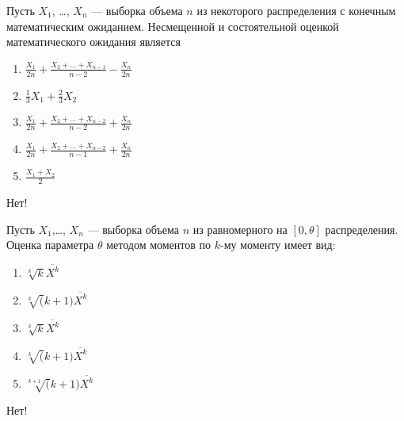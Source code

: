 \documentclass[t]{beamer}
\begin{document}
 \begin{frame} \label{33-No} 
\begin{block}{33} 

Пусть $X_1$, \ldots, $X_n$ — выборка объема $n$ из некоторого распределения с конечным математическим ожиданием. Несмещенной и состоятельной оценкой математического ожидания является
 


 \end{block} 
\begin{enumerate} 
\item[] \hyperlink{33-Yes}{\beamergotobutton{} $\frac{X_1}{2n}+\frac{X_2+\ldots+X_{n-1}}{n-2}-\frac{X_n}{2 n}$}
\item[] \hyperlink{33-No}{\beamergotobutton{} $\frac{1}{3} X_1 + \frac{2}{3} X_2$}
\item[] \hyperlink{33-No}{\beamergotobutton{} $\frac{X_1}{2 n}+\frac{X_2+\ldots+X_{n-2}}{n-2}+\frac{X_n}{2 n}$}
\item[] \hyperlink{33-No}{\beamergotobutton{} $\frac{X_1}{2 n}+\frac{X_2+\ldots+X_{n-2}}{n-1}+\frac{X_n}{2 n}$}
\item[] \hyperlink{33-No}{\beamergotobutton{} $\frac{X_1+X_2}{2}$}
\end{enumerate} 

 \alert{Нет!} 
\end{frame} 


 \begin{frame} \label{34-No} 
\begin{block}{34} 

Пусть $X_1$,\ldots, $X_n$ — выборка объема $n$ из равномерного на $[0, \theta]$ распределения. Оценка параметра $\theta$ методом моментов по $k$-му моменту имеет вид:
 


 \end{block} 
\begin{enumerate} 
\item[] \hyperlink{34-No}{\beamergotobutton{} $\sqrt[k]k \overline{X^k}$}
\item[] \hyperlink{34-No}{\beamergotobutton{} $\sqrt[k](k+1) \overline{X^k}$}
\item[] \hyperlink{34-No}{\beamergotobutton{} $\sqrt[k]k \overline{X^k}$}
\item[] \hyperlink{34-Yes}{\beamergotobutton{} $\sqrt[k](k+1) \overline{X^k}$}
\item[] \hyperlink{34-No}{\beamergotobutton{} $\sqrt[k+1](k+1) \overline{X^k}$}
\end{enumerate} 

 \alert{Нет!} 
\end{frame} 
\end{document}
